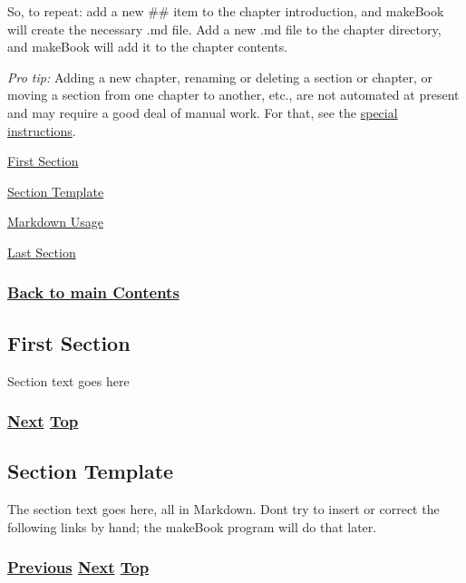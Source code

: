 \documentclass[
]{article}
\begin{document}
So, to repeat: add a new \#\# item to the chapter introduction, and
makeBook will create the necessary .md file. Add a new .md file to the
chapter directory, and makeBook will add it to the chapter contents.

\emph{Pro tip:} Adding a new chapter, renaming or deleting a section or
chapter, or moving a section from one chapter to another, etc., are not
automated at present and may require a good deal of manual work. For
that, see the
\href{https://github.com/becarpenter/book6/blob/main/utilities/chapterReorg.md}{special
instructions}.

\hyperref[first-section]{First Section}

\hyperref[section-template]{Section Template}

\hyperref[markdown-usage]{Markdown Usage}

\hyperref[last-section]{Last Section}

\subsubsection{\texorpdfstring{\hyperref[list-of-contents]{Back to main
Contents}}{Back to main Contents}}\label{back-to-main-contents-11}

\pagebreak

\subsection{First Section}\label{first-section}

Section text goes here

\subsubsection{\texorpdfstring{\hyperref[section-template]{Next}
\hyperref[chapter-template]{Top}}{Next Top}}\label{next-top-10}

\pagebreak

\subsection{Section Template}\label{section-template}

The section text goes here, all in Markdown. Don\textquotesingle t try
to insert or correct the following links by hand; the makeBook program
will do that later.

\subsubsection{\texorpdfstring{\hyperref[first-section]{Previous}
\hyperref[markdown-usage]{Next}
\hyperref[chapter-template]{Top}}{Previous Next Top}}\label{previous-next-top-39}
\end{document}
